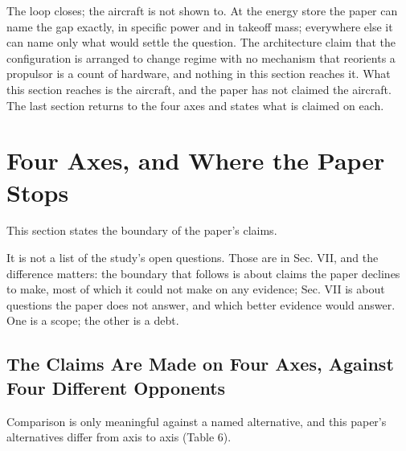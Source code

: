 \documentclass[journal]{new-aiaa}
\begin{document}
The loop closes; the aircraft is not shown to. At the energy store the paper can name the gap exactly, in specific power and in takeoff mass; everywhere else it can name only what would settle the question. The architecture claim that the configuration is arranged to change regime with no mechanism that reorients a propulsor is a count of hardware, and nothing in this section reaches it. What this section reaches is the aircraft, and the paper has not claimed the aircraft. The last section returns to the four axes and states what is claimed on each.

\section{Four Axes, and Where the Paper Stops}

This section states the boundary of the paper's claims.

It is not a list of the study's open questions. Those are in Sec. VII, and the difference matters: the boundary that follows is about claims the paper declines to make, most of which it could not make on any evidence; Sec. VII is about questions the paper does not answer, and which better evidence would answer. One is a scope; the other is a debt.

\subsection{The Claims Are Made on Four Axes, Against Four Different Opponents}

Comparison is only meaningful against a named alternative, and this paper's alternatives differ from axis to axis (Table 6).
\end{document}

